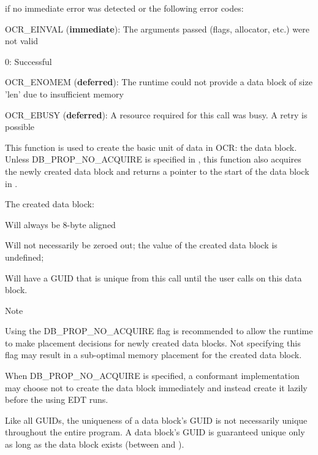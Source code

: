  if no immediate error was detected or the following error codes:
\begin{DoxyItemize}
\item OCR\_EINVAL ({\bf immediate}): The arguments passed (flags, allocator, etc.) were
  not valid
\item 0: Successful
\item OCR\_ENOMEM ({\bf deferred}): The runtime could not provide a data block of size
  'len' due to insufficient memory
\item OCR\_EBUSY ({\bf deferred}): A resource required for this call was busy. A retry
  is possible
\end{DoxyItemize}

\descr
This function is used to create the basic unit of data in OCR: the
data block. Unless DB\_PROP\_NO\_ACQUIRE is specified in , this
function also acquires the newly created data block and returns a
pointer to the start of the data block in .

The created data block:
\begin{DoxyItemize}
\item Will always be 8-byte aligned
\item Will not necessarily be zeroed out; the value of the created
  data block is undefined;
\item Will have a GUID that is unique from this call until the user
  calls  on this data block.
\end{DoxyItemize}

\begin{DoxyNote}{Note}
\begin{DoxyItemize}
\item Using the DB\_PROP\_NO\_ACQUIRE flag is recommended to allow the
  runtime to make placement decisions for newly created
  data blocks. Not specifying this flag may result in a sub-optimal
  memory placement for the created data block.
\item When DB\_PROP\_NO\_ACQUIRE is specified, a conformant
  implementation may choose not to create the data block immediately
  and instead create it lazily before the using EDT runs.
\item Like all GUIDs, the uniqueness of a data block's GUID is not
  necessarily unique throughout the entire program. A data block's
  GUID is guaranteed unique only as long as the data block exists
  (between  and ).
\end{DoxyItemize}
\end{DoxyNote}

